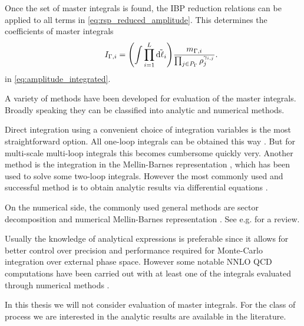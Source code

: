 Once the set of master integrals is found, the IBP reduction relations can be applied 
to all terms in \cref{eq:rsp_reduced_amplitude}.
This determines the coefficients of master integrals
\begin{equation} \label{eq:master_integrals}
    \qquad I_{\Gamma,i} = 
    \qty(\int \prod_{i=1}^{L} \tilde{\dd{\ell_i}}) \frac{m_{\Gamma,i}}{\prod_{j\in P_\Gamma} \rho_j^{\gamma_{i,j}}}.
\end{equation}
in \cref{eq:amplitude_integrated}.


A variety of methods have been developed for evaluation of the master integrals.
Broadly speaking they can be classified into analytic and numerical methods.

Direct integration using a convenient choice of integration variables is the most straightforward option.
All one-loop integrals can be obtained this way \cite{vanHameren:2010cp,Ellis:2007qk,tHooft:1978jhc,Denner:2010tr}.
But for multi-scale multi-loop integrals this becomes  cumbersome quickly  very.
Another method is the integration in the Mellin-Barnes  representation  \cite{Smirnov:1999gc,Tausk:1999vh,Dubovyk:2017cqw}, which
has been used to solve some two-loop integrals.
However the most commonly used and successful method is to obtain analytic results via
differential equations \cite{Kotikov:1990kg,Remiddi:1997ny,Gehrmann:1999as,Henn:2013pwa,Argeri:2007up,Henn:2014qga}.

On the numerical side, the commonly used general methods are sector decomposition \cite{Binoth:2000ps,Binoth:2003ak}
and numerical Mellin-Barnes representation \cite{Czakon:2005rk,Anastasiou:2005cb}.
See e.g. \cite{Freitas:2016sty} for a review.

Usually the knowledge of analytical expressions is preferable since it allows for better control over
precision and performance required for Monte-Carlo integration over external phase space. However
some notable NNLO QCD computations have been carried out with at least one of the integrals evaluated through numerical
methods .

In this thesis we will not consider evaluation of master integrals.
For the class of process we are interested in the analytic results are available in the literature.
